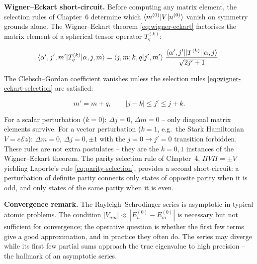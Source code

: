 \medskip\noindent\textbf{Wigner--Eckart short-circuit.}
Before computing any matrix element, the selection rules of Chapter~6 determine which $\braket{m^{(0)}|V|n^{(0)}}$ vanish on symmetry grounds alone. The Wigner--Eckart theorem \eqref{eq:wigner-eckart} factorises the matrix element of a spherical tensor operator $T^{(k)}_{q}$:
\begin{linenomath}
\begin{equation*}
\braket{\alpha',j',m'|T^{(k)}_{q}|\alpha,j,m}
= \braket{j,m;k,q|j',m'}\,\frac{\braket{\alpha',j'||T^{(k)}||\alpha,j}}{\sqrt{2j'+1}}.
\end{equation*}
\end{linenomath}
The Clebsch--Gordan coefficient vanishes unless the selection rules \eqref{eq:wigner-eckart-selection} are satisfied:
\begin{linenomath}
\begin{equation*}
m' = m + q,\qquad |j-k| \le j' \le j+k.
\end{equation*}
\end{linenomath}
For a scalar perturbation ($k=0$): $\Delta j = 0$, $\Delta m = 0$ -- only diagonal matrix elements survive. For a vector perturbation ($k=1$, e.g.\ the Stark Hamiltonian $V = e\mathcal{E}z$): $\Delta m = 0$, $\Delta j = 0,\pm1$ with the $j=0 \to j'=0$ transition forbidden. These rules are not extra postulates -- they are the $k=0,1$ instances of the Wigner--Eckart theorem. The parity selection rule of Chapter~4, $\Pi V \Pi = \pm V$ yielding Laporte's rule \eqref{eq:parity-selection}, provides a second short-circuit: a perturbation of definite parity connects only states of opposite parity when it is odd, and only states of the same parity when it is even.

\medskip\noindent\textbf{Convergence remark.}
The Rayleigh--Schrodinger series is asymptotic in typical atomic problems. The condition $|V_{nm}| \ll |E_n^{(0)}-E_m^{(0)}|$ is necessary but not sufficient for convergence; the operative question is whether the first few terms give a good approximation, and in practice they often do. The series may diverge while its first few partial sums approach the true eigenvalue to high precision -- the hallmark of an asymptotic series.

